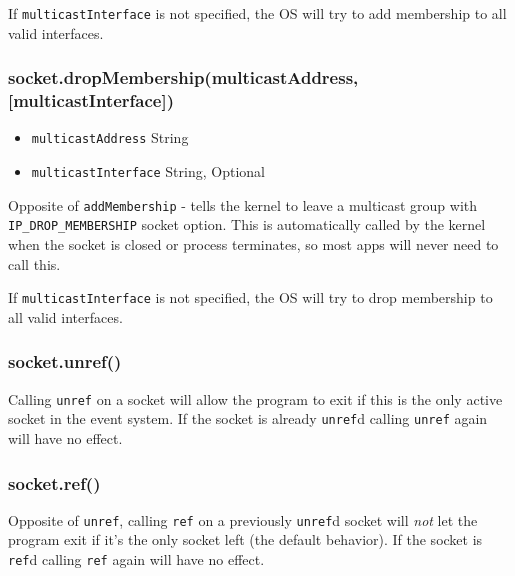If \texttt{multicastInterface} is not specified, the OS will try to add
membership to all valid interfaces.

\subsubsection{socket.dropMembership(multicastAddress,
{[}multicastInterface{]})}\label{socket.dropmembershipmulticastaddress-multicastinterface}

\begin{itemize}
\itemsep1pt\parskip0pt
\item
  \texttt{multicastAddress} String
\item
  \texttt{multicastInterface} String, Optional
\end{itemize}

Opposite of \texttt{addMembership} - tells the kernel to leave a
multicast group with \texttt{IP\_DROP\_MEMBERSHIP} socket option. This
is automatically called by the kernel when the socket is closed or
process terminates, so most apps will never need to call this.

If \texttt{multicastInterface} is not specified, the OS will try to drop
membership to all valid interfaces.

\subsubsection{socket.unref()}\label{socket.unref}

Calling \texttt{unref} on a socket will allow the program to exit if
this is the only active socket in the event system. If the socket is
already \texttt{unref}d calling \texttt{unref} again will have no
effect.

\subsubsection{socket.ref()}\label{socket.ref}

Opposite of \texttt{unref}, calling \texttt{ref} on a previously
\texttt{unref}d socket will \emph{not} let the program exit if it's the
only socket left (the default behavior). If the socket is \texttt{ref}d
calling \texttt{ref} again will have no effect.
